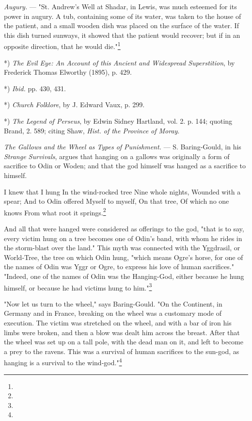 \documentclass[a4paper, 11pt, oneside, polutonikogreek, english]{article}
\begin{document}
\emph{Augury.} --- "St. Andrew's Well at Shadar, in Lewis, was much esteemed for its power in augury. A tub, containing some of its water, was taken to the house of the patient, and a small wooden dish was placed on the surface of the water. If this dish turned sunways, it showed that the patient would recover; but if in an opposite direction, that he would die."\footnote{}

*) \emph{The Evil Eye: An Account of this Ancient and Widespread Superstition}, by Frederick Thomas Elworthy (1895), p. 429.

*) \emph{Ibid.} pp. 430, 431.

*) \emph{Church Folklore}, by J. Edward Vaux, p. 299.

*) \emph{The Legend of Perseus}, by Edwin Sidney Hartland, vol. 2. p. 144; quoting Brand, 2. 589; citing Shaw, \emph{Hist. of the Province of Moray}.

\emph{The Gallows and the Wheel as Types of Punishment.} --- S. Baring-Gould, in his \emph{Strange Survivals}, argues that hanging on a gallows was originally a form of sacrifice to Odin or Woden; and that the god himself was hanged as a sacrifice to himself.

I knew that I hung  
In the wind-rocked tree  
Nine whole nights,  
Wounded with a spear;  
And to Odin offered  
Myself to myself,  
On that tree,  
Of which no one knows  
From what root it springs.\footnote{}

And all that were hanged were considered as offerings to the god, "that is to say, every victim hung on a tree becomes one of Odin's band, with whom he rides in the storm-blast over the land." This myth was connected with the Yggdrasil, or World-Tree, the tree on which Odin hung, "which means Ogre's horse, for one of the names of Odin was Yggr or Ogre, to express his love of human sacrifices." "Indeed, one of the names of Odin was the Hanging-God, either because he hung himself, or because he had victims hung to him."\footnote{}

"Now let us turn to the wheel," says Baring-Gould. "On the Continent, in Germany and in France, breaking on the wheel was a customary mode of execution. The victim was stretched on the wheel, and with a bar of iron his limbs were broken, and then a blow was dealt him across the breast. After that the wheel was set up on a tall pole, with the dead man on it, and left to become a prey to the ravens. This was a survival of human sacrifices to the sun-god, as hanging is a survival to the wind-god."\footnote{}
\end{document}
